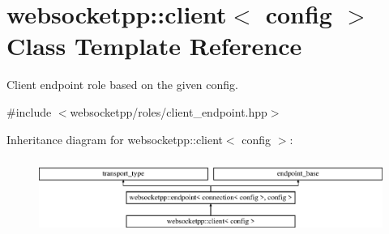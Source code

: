 \hypertarget{classwebsocketpp_1_1client}{}\section{websocketpp\+:\+:client$<$ config $>$ Class Template Reference}
\label{classwebsocketpp_1_1client}


Client endpoint role based on the given config.  




{\ttfamily \#include $<$websocketpp/roles/client\+\_\+endpoint.\+hpp$>$}

Inheritance diagram for websocketpp\+:\+:client$<$ config $>$\+:\begin{figure}[H]
\begin{center}
\leavevmode
\includegraphics[height=2.500000cm]{classwebsocketpp_1_1client}
\end{center}
\end{figure}
